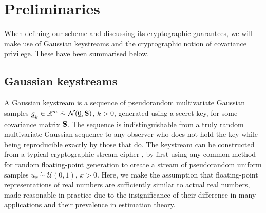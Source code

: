 \documentclass[letterpaper, 10 pt, conference]{ieeeconf}
\begin{document}
% 
%                                                                 
%                                                                 
%                                                                 
% 

\section{Preliminaries}\label{sec:prelim}
When defining our scheme and discussing its cryptographic guarantees, we will make use of Gaussian keystreams and the cryptographic notion of covariance privilege. These have been summarised below.

% 
% 

\subsection{Gaussian keystreams}\label{subsec:gauss_keystreams}
A Gaussian keystream is a sequence of pseudorandom multivariate Gaussian samples $\vec{g}_k\in\mathbb{R}^m\ \dot{\sim}\ \mathcal{N}(\vec{0},\mat{S})$, $k>0$, generated using a secret key, for some covariance matrix ${{\mathbf{S}}}$. The sequence is indistinguishable from a truly random multivariate Gaussian sequence to any observer who does not hold the key while being reproducible exactly by those that do. The keystream can be constructed from a typical cryptographic stream cipher \cite[Ch. 3.6]{katzIntroductionModernCryptography2008}, by first using any common method for random floating-point generation \cite{goualardGeneratingRandomFloatingPoint2020} to create a stream of pseudorandom uniform samples $u_x\ \dot{\sim}\ \mathcal{U}(0,1)$, $x>0$. Here, we make the assumption that floating-point representations of real numbers are sufficiently similar to actual real numbers, made reasonable in practice due to the insignificance of their difference in many applications and their prevalence in estimation theory.
\end{document}
